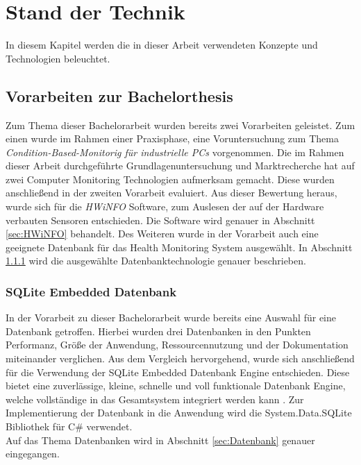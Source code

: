 \chapter{Stand der Technik}
In diesem Kapitel werden die in dieser Arbeit verwendeten Konzepte und Technologien beleuchtet. 

\section{Vorarbeiten zur Bachelorthesis}
Zum Thema dieser Bachelorarbeit wurden bereits zwei Vorarbeiten geleistet. Zum einen wurde im Rahmen einer Praxisphase, eine Voruntersuchung zum Thema \textit{Condition-Based-Monitorig für industrielle PCs}  vorgenommen. Die im Rahmen dieser Arbeit \cite{PAMathias} durchgeführte Grundlagenuntersuchung und Marktrecherche hat auf zwei Computer Monitoring Technologien aufmerksam gemacht. Diese wurden anschließend in der zweiten Vorarbeit \cite{t3000} evaluiert. Aus dieser Bewertung heraus, wurde sich für die \textit{HWiNFO} Software, zum Auslesen der auf der Hardware verbauten Sensoren entschieden. Die Software wird genauer in Abschnitt \ref{sec:HWiNFO} behandelt. Des Weiteren wurde in der Vorarbeit \cite{t3000} auch eine geeignete Datenbank für das Health Monitoring System ausgewählt. In Abschnitt \ref{sec:SQLite} wird die ausgewählte Datenbanktechnologie genauer beschrieben. 

\subsection{SQLite Embedded Datenbank}\label{sec:SQLite}
In der Vorarbeit zu dieser Bachelorarbeit wurde bereits eine Auswahl für eine Datenbank getroffen. Hierbei wurden drei Datenbanken in den Punkten Performanz, Größe der Anwendung, Ressourcennutzung und der Dokumentation miteinander verglichen. Aus dem Vergleich hervorgehend, wurde sich anschließend für die Verwendung der SQLite Embedded Datenbank Engine entschieden. Diese bietet eine zuverlässige, kleine, schnelle und voll funktionale Datenbank Engine, welche vollständige in das Gesamtsystem integriert werden kann \cite{SQLiteHompage}. Zur Implementierung der Datenbank in die Anwendung wird die System.Data.SQLite Bibliothek für C\# verwendet.\\ 
Auf das Thema Datenbanken wird in Abschnitt \ref{sec:Datenbank} genauer eingegangen.

